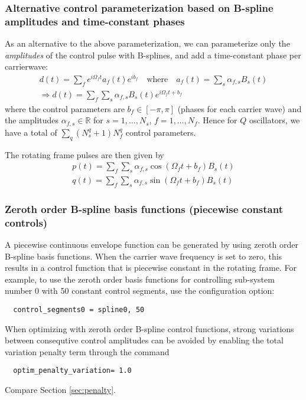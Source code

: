 \documentclass[11pt]{article}
\newcommand{\R}{\mathds{R}}
\begin{document}
  \subsubsection{Alternative control parameterization based on B-spline amplitudes and time-constant phases}
  As an alternative to the above parameterization, we can parameterize only the \textit{amplitudes} of the control pulse with B-splines, and add a time-constant phase per carrierwave:
  \begin{align}
    d(t) = \sum_f e^{i\Omega_f t} a_f(t)e^{ib_f} \quad \text{where} \quad a_f(t) = \sum_s \alpha_{f,s} B_s(t) \\
    \Rightarrow d(t)= \sum_f\sum_s \alpha_{f,s}B_s(t)e^{i\Omega_ft + b_f}
  \end{align}
  where the control parameters are $b_f\in [-\pi, \pi]$ (phases for each carrier wave) and the amplitudes $\alpha_{f,s}\in \R$ for $s=1,\dots, N_s$, $f=1,\dots, N_f$. Hence for $Q$ oscillators, we have a total of $\sum_q (N_s^q + 1) N_f^q$ control parameters.

  The rotating frame pulses are then given by 
  \begin{align}
    p(t) = \sum_f \sum_s \alpha_{f,s} \cos(\Omega_f t + b_f) B_s(t) \\
    q(t) = \sum_f \sum_s \alpha_{f,s} \sin(\Omega_f t + b_f) B_s(t)
  \end{align}

\subsubsection{Zeroth order B-spline basis functions (piecewise constant controls)}\label{subsec:bspline-0}
A piecewise continuous envelope function can be generated by using zeroth order B-spline basis functions. When the carrier wave frequency is set to zero, this results in a control function that is piecewise constant in the rotating frame. For example, to use the zeroth order basis functions for controlling sub-system number 0 with 50 constant control segments, use the configuration option:
\begin{verbatim} 
  control_segments0 = spline0, 50
\end{verbatim}
When optimizing with zeroth order B-spline control functions, strong variations between consequtive control amplitudes can be avoided by enabling the total variation penalty term through the command
\begin{verbatim} 
  optim_penalty_variation= 1.0
\end{verbatim}
Compare Section \ref{sec:penalty}.
\end{document}
